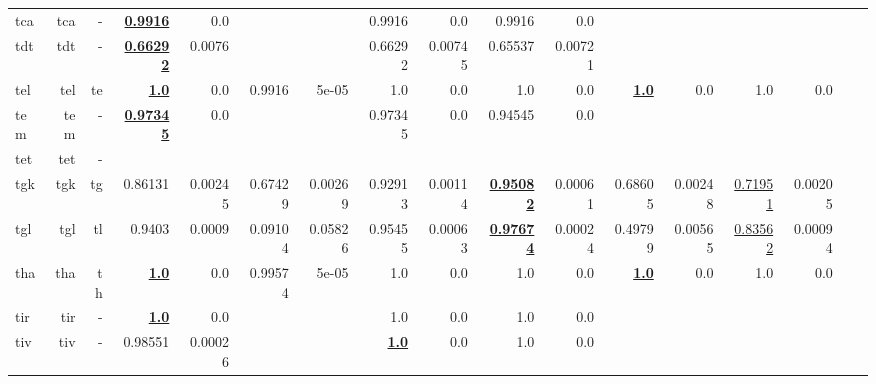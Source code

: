 \documentclass[11pt]{article}
\begin{document}
\begin{table*}[h]
{\begin{tabular}{lrrrrrrrrrrrrrrrr}
tca         & tca         & -         & \textbf{\underline{0.9916}}         & 0.0         &          &          & 0.9916         & 0.0         & 0.9916         & 0.0         &          &          &          &          \\
tdt         & tdt         & -         & \textbf{\underline{0.66292}}         & 0.0076         &          &          & 0.66292         & 0.00745         & 0.65537         & 0.00721         &          &          &          &          \\
tel         & tel         & te         & \textbf{\underline{1.0}}         & 0.0         & 0.9916         & 5e-05         & 1.0         & 0.0         & 1.0         & 0.0         & \textbf{\underline{1.0}}         & 0.0         & 1.0         & 0.0         \\
tem         & tem         & -         & \textbf{\underline{0.97345}}         & 0.0         &          &          & 0.97345         & 0.0         & 0.94545         & 0.0         &          &          &          &          \\
tet         & tet         & -         &          &          &          &          &          &          &          &          &          &          &          &          \\
tgk         & tgk         & tg         & 0.86131         & 0.00245         & 0.67429         & 0.00269         & 0.92913         & 0.00114         & \textbf{\underline{0.95082}}         & 0.00061         & 0.68605         & 0.00248         & \underline{0.71951}         & 0.00205         \\
tgl         & tgl         & tl         & 0.9403         & 0.0009         & 0.09104         & 0.05826         & 0.95455         & 0.00063         & \textbf{\underline{0.97674}}         & 0.00024         & 0.49799         & 0.00565         & \underline{0.83562}         & 0.00094         \\
tha         & tha         & th         & \textbf{\underline{1.0}}         & 0.0         & 0.99574         & 5e-05         & 1.0         & 0.0         & 1.0         & 0.0         & \textbf{\underline{1.0}}         & 0.0         & 1.0         & 0.0         \\
tir         & tir         & -         & \textbf{\underline{1.0}}         & 0.0         &          &          & 1.0         & 0.0         & 1.0         & 0.0         &          &          &          &          \\
tiv         & tiv         & -         & 0.98551         & 0.00026         &          &          & \textbf{\underline{1.0}}         & 0.0         & 1.0         & 0.0         &          &          &          &          \\

\end{tabular}}
\end{table*}
\end{document}

